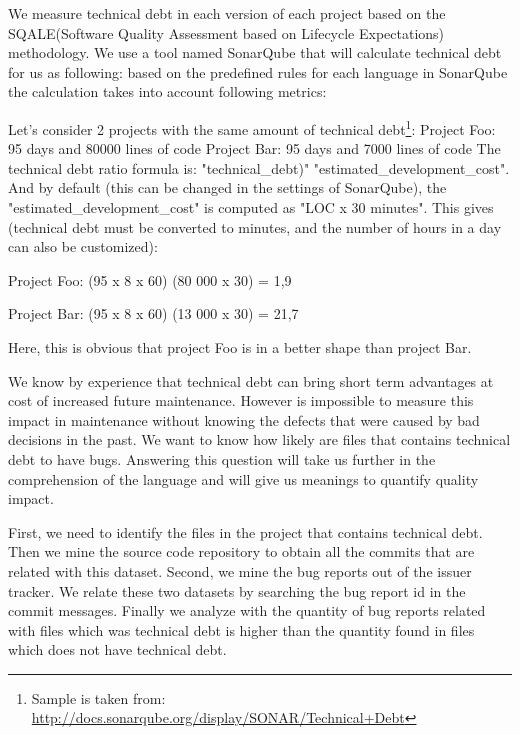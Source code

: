 We measure technical debt in each version of each project based on the SQALE(Software Quality Assessment based on Lifecycle Expectations) methodology. We use a tool named SonarQube that will calculate technical debt for us as following: based on the predefined rules for each language in SonarQube the calculation takes into account following metrics:


Let's consider 2 projects with the same amount of technical debt\footnote{Sample is taken from: \url{ http://docs.sonarqube.org/display/SONAR/Technical+Debt}}:
Project Foo: 95 days and 80000 lines of code
Project Bar: 95 days and 7000 lines of code
The technical debt ratio formula is: "technical\_debt)" \/ "estimated\_development\_cost". And by default (this can be changed in the settings of SonarQube), the "estimated\_development\_cost" is computed as "LOC x 30 minutes". This gives (technical debt must be converted to minutes, and the number of hours in a day can also be customized):
\par
Project Foo: (95 x 8 x 60) \/ (80 000 x 30) = 1,9%
\par
Project Bar: (95 x 8 x 60) \/ (13 000 x 30) = 21,7%
\par
Here, this is obvious that project Foo is in a better shape than project Bar.

\noindent{\rqiii}

 We know by experience that technical debt can bring short term advantages at cost of increased future maintenance. However is impossible to measure this impact in maintenance without knowing the defects that were caused by bad decisions in the past. We want to know how likely are files that contains technical debt to have bugs. Answering this question will take us further in the comprehension of the language and will give us meanings to quantify quality impact. 


 First, we need to identify the files in the project that contains technical debt. Then we mine the source code repository to obtain all the commits that are related with this dataset. Second, we mine the bug reports out of the issuer tracker. We relate these two datasets by searching the bug report id in  the commit messages. Finally we analyze with the quantity of bug reports related with files which was technical debt is higher than the quantity found in files which does not have technical debt. 